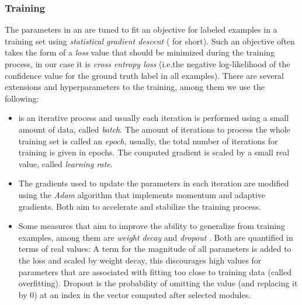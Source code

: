 \documentclass[../document.tex]{subfiles}
\begin{document}
    \subsubsection{Training}
    The parameters in an  are tuned to fit an objective for labeled examples in a training set using \emph{statistical gradient descent} ( for short).
    Such an objective often takes the form of a \emph{loss} value that should be minimized during the training process, in our case it is \emph{cross entropy loss} (i.e.\@ the negative log-likelihood of the confidence value for the ground truth label in all examples).
    There are several extensions and hyperparameters to the training, among them we use the following:
    \begin{itemize}
        \item
             is an iterative process and usually each iteration is performed using a small amount of data, called \emph{batch}.
            The amount of iterations to process the whole training set is called an \emph{epoch}, usually, the total number of iterations for training is given in epochs.
            The computed gradient is scaled by a small real value, called \emph{learning rate}.
        \item
            The gradients used to update the parameters in each iteration are modified using the \emph{Adam} algorithm \citep{adam,adamw} that implements momentum and adaptive gradients.
            Both aim to accelerate and stabilize the training process.
        \item
            Some measures that aim to improve the ability to generalize from training examples, among them are \emph{weight decay} and \emph{dropout} \citep{dropout}.
            Both are quantified in terms of real values:
                A term for the magnitude of all parameters is added to the loss and scaled by weight decay, this discourages high values for parameters that are associated with fitting too close to training data (called overfitting).
                Dropout is the probability of omitting the value (and replacing it by \(0\)) at an index in the vector computed after selected modules.
    \end{itemize}
\end{document}
